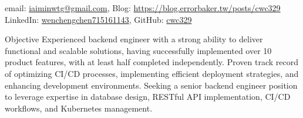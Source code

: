 \documentclass[
	11pt, %
]{resume} %
\begin{document}
%
email: \href{mailto:iaiminwtg@gmail.com}{iaiminwtg@gmail.com}, Blog: \href{https://blog.errorbaker.tw/posts/cwc329}{https://blog.errorbaker.tw/posts/cwc329} \\
LinkedIn: \href{https://www.linkedin.com/in/wenchengchen715161143}{wenchengchen715161143}, GitHub: \href{https://github.com/cwc329}{cwc329}


\begin{rSection}{Objective}
    Experienced backend engineer with a strong ability to deliver functional and scalable solutions, having successfully implemented over 10 product features, with at least half completed independently.
    Proven track record of optimizing CI/CD processes, implementing efficient deployment strategies, and enhancing development environments.
    Seeking a senior backend engineer position to leverage expertise in database design, RESTful API implementation, CI/CD workflows, and Kubernetes management.
\end{rSection}
\end{document}
